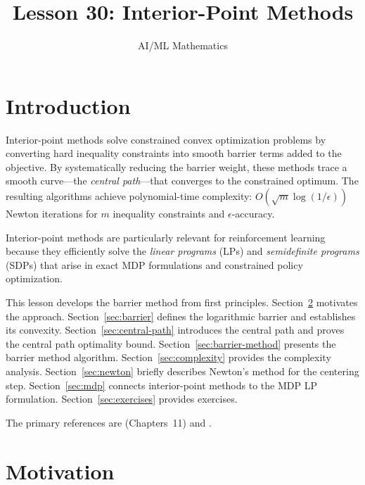 \documentclass[11pt,a4paper]{article}
\title{Lesson 30: Interior-Point Methods}
\author{AI/ML Mathematics}
\date{}
\begin{document}
\maketitle
\tableofcontents
\newpage


\section{Introduction}\label{sec:intro}

Interior-point methods solve constrained convex optimization problems
by converting hard inequality constraints into smooth barrier terms
added to the objective. By systematically reducing the barrier weight,
these methods trace a smooth curve---the \emph{central path}---that
converges to the constrained optimum. The resulting algorithms achieve
polynomial-time complexity: $O(\sqrt{m}\log(1/\epsilon))$ Newton
iterations for $m$ inequality constraints and $\epsilon$-accuracy.

Interior-point methods are particularly relevant for reinforcement
learning because they efficiently solve the \emph{linear programs} (LPs)
and \emph{semidefinite programs} (SDPs) that arise in exact MDP
formulations and constrained policy optimization.

This lesson develops the barrier method from first principles.
Section~\ref{sec:motivation} motivates the approach.
Section~\ref{sec:barrier} defines the logarithmic barrier and
establishes its convexity.
Section~\ref{sec:central-path} introduces the central path and proves
the central path optimality bound.
Section~\ref{sec:barrier-method} presents the barrier method algorithm.
Section~\ref{sec:complexity} provides the complexity analysis.
Section~\ref{sec:newton} briefly describes Newton's method for the
centering step.
Section~\ref{sec:mdp} connects interior-point methods to the MDP
LP formulation.
Section~\ref{sec:exercises} provides exercises.

The primary references are \citet{boyd2004} (Chapters~11) and
\citet{wright1997}.


\section{Motivation}\label{sec:motivation}
\end{document}
